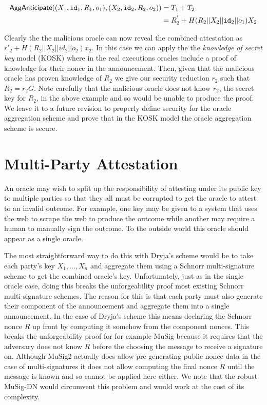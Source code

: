 \documentclass[runningheads]{llncs}
\newcommand{\eventid}{\mathtt{id}}
\newcommand{\Att}{T}
\begin{document}
\begin{align*}
\AggAnticipate((X_{1}, \eventid_{1}, R_{1}, o_{1}), (X_{2}, \eventid_{2}, R_{2}, o_{2})) & =  \Att_{1} + \Att_{2} \\
& = R^{'}_{2} + H(R_{2} || X_{2} || \eventid_2 || o_{1})X_{2}
\end{align*}

Clearly the the malicious oracle can now reveal the combined attestation as $r'_{2} + H(R_{2}||X_{2}||id_{2}|| o_{2})x_{2}$.
In this case we can apply the the \emph{knowledge of secret key} model (KOSK) \cite{kosk} where in the real executions oracles include a proof of knowledge for their nonce in the announcement.
Then, given that the malicious oracle has proven knowledge of $R_{2}$ we give our security reduction $r_{2}$ such that $R_{2} = r_{2}G$.
Note carefully that the malicious oracle does not know $r_{2}$, the secret key for $R_{2}$, in the above example and so would be unable to produce the proof.
We leave it to a future revision to properly define security for the oracle aggregation scheme and prove that in the KOSK model the oracle aggregation scheme is secure.

\section{Multi-Party Attestation}
\newcommand{\MultiKeyGen}{\textsf{MultiKeyGen}}
\newcommand{\MultiAnnounce}{\textsf{MultiAnnounce}}
\newcommand{\MultiAttest}{\textsf{MultiAttest}}

An oracle may wish to split up the responsibility of attesting under its public key to multiple parties so that they all must be corrupted to get the oracle to attest to an invalid outcome.
For example, one key may be given to a system that uses the web to scrape the web to produce the outcome while another may require a human to manually sign the outcome.
To the outside world this oracle should appear as a single oracle.

The most straightforward way to do this with Dryja's scheme would be to take each party's key $X_{1},\ldots, X_{n}$ and aggregate them using a Schnorr multi-signature scheme to get the combined oracle's key.
Unfortunately, just as in the single oracle case, doing this breaks the unforgeability proof most existing Schnorr multi-signature schemes.
The reason for this is that each party must also generate their component of the announcement and aggregate them into a single announcement.
In the case of Dryja's scheme this means declaring the Schnorr nonce $R$ up front by computing it somehow from the component nonces.
This breaks the unforgeability proof for for example MuSig\cite{musig} because it requires that the adversary does not know $R$ before the choosing the message to receive a signature on.
Although MuSig2\cite{musig2} actually does allow pre-generating public nonce data in the case of multi-signatures it does not allow computing the final nonce $R$ until the message is known and so cannot be applied here either.
We note that the robust MuSig-DN\cite{musig-dn} would circumvent this problem and would work at the cost of its complexity.
\end{document}
